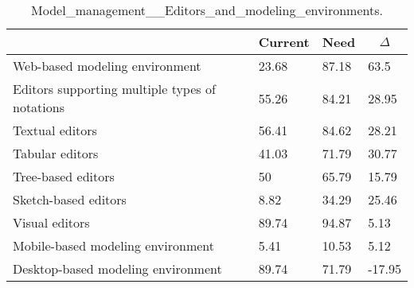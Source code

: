 
  \begin{table*}[]
  \centering
  \notsotiny
  \caption{ Model_management__Editors_and_modeling_environments.}
\label{tab:model_management__editors_and_modeling_environments}
\begin{tabular}{|l|l|l|l|}
  \hline
  \rowcolor[HTML]{C0C0C0}
    \multicolumn{1}{|c|}{Feature} & \multicolumn{1}{c|}{Current} & \multicolumn{1}{c|}{Need} & \multicolumn{1}{c|}{$\Delta$} \\ \hline
  Web-based modeling environment & 23.68 & 87.18 & 63.5 \\ \hline 
Editors supporting multiple types of notations & 55.26 & 84.21 & 28.95 \\ \hline 
Textual editors & 56.41 & 84.62 & 28.21 \\ \hline 
Tabular editors & 41.03 & 71.79 & 30.77 \\ \hline 
Tree-based editors & 50 & 65.79 & 15.79 \\ \hline 
Sketch-based editors & 8.82 & 34.29 & 25.46 \\ \hline 
Visual editors & 89.74 & 94.87 & 5.13 \\ \hline 
Mobile-based modeling environment & 5.41 & 10.53 & 5.12 \\ \hline 
Desktop-based modeling environment & 89.74 & 71.79 & -17.95 \\ \hline 
\end{tabular}%
  \end{table*}
